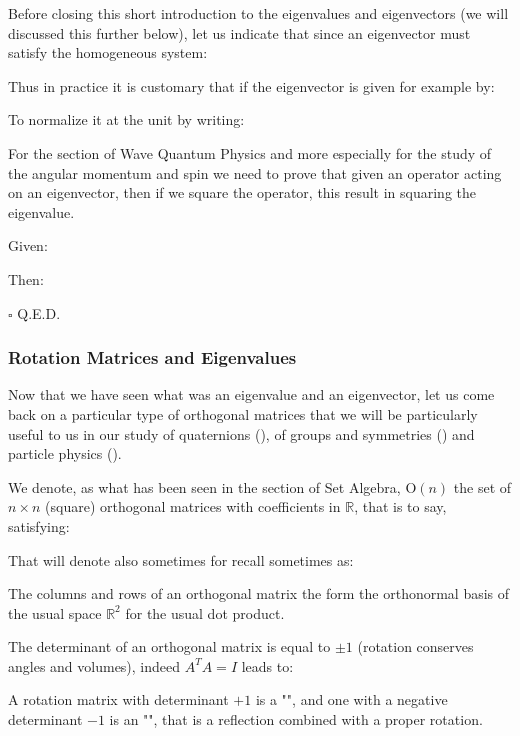 	Before closing this short introduction to the eigenvalues and eigenvectors (we will discussed this further below), let us indicate that since an eigenvector must satisfy the homogeneous system:
	
	
	Thus in practice it is customary that if the eigenvector is given for example by:
	
	To normalize it at the unit by writing:
	
	
	For the section of Wave Quantum Physics and more especially for the study of the angular momentum and spin we need to prove that given an operator acting on an eigenvector, then if we square the operator, this result in squaring the eigenvalue.
	\begin{dem}
	Given:
	
	Then:
	
	\begin{flushright}
		$\square$  Q.E.D.
	\end{flushright}
	\end{dem}
	
	\subsubsection{Rotation Matrices and Eigenvalues}
	Now that we have seen what was an eigenvalue and an eigenvector, let us come back on a particular type of orthogonal matrices that we will be particularly useful to us in our study of quaternions (), of groups and symmetries () and particle physics ().
	
	We denote, as what has been seen in the section of Set Algebra, $\text{O}(n)$ the set of $n\times n$ (square) orthogonal matrices with coefficients in $\mathbb{R}$, that is to say, satisfying:
	
	That will denote also sometimes for recall sometimes as:
	
	The columns and rows of an orthogonal matrix the form the orthonormal basis of the usual space $\mathbb{R}^2$ for the usual dot product.
	
	The determinant of an orthogonal matrix is equal to $\pm 1$ (rotation conserves angles and volumes), indeed $A^T A=I$  leads to:
	
	A rotation matrix with determinant $+1$ is a "", and one with a negative determinant $-1$ is an "", that is a reflection combined with a proper rotation.
	
